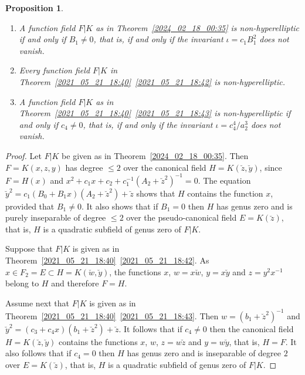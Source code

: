 \documentclass[12pt,reqno]{amsart}
\newtheorem{prop}[thm]{Proposition}
\theoremstyle{definition}
\newcommand{\cy}{{\breve{y}}}
\begin{document}
\begin{prop}\label{2024_08_04_19:50}
$ $
\begin{enumerate}[\upshape (a)]
    \item A function field $F|K$ as in Theorem~\ref{2024_02_18_00:35} is non-hyperelliptic if and only if $B_1 \neq 0$, that is, if and only if the invariant $\iota = c_1 B_1^2$ does not vanish.
    
    \item Every function field $F|K$ in Theorem~\ref{2021_05_21_18:40}~\ref{2021_05_21_18:42} is non-hyperelliptic.
    
    \item A function field $F|K$ as in Theorem~\ref{2021_05_21_18:40}~\ref{2021_05_21_18:43} is non-hyperelliptic if and only if $c_4\neq 0$, that is, if and only if the invariant $\iota = c_4^4/a_2^3$
does not vanish.
\end{enumerate}
\end{prop}

\begin{proof}
Let $F|K$ be given as in Theorem~\ref{2024_02_18_00:35}. 
Then $F=K(x,z,y)$ has degree $\leq 2$ over the canonical field $H=K(\breve z, \breve y)$, since $F=H(x)$ and $x^2 + c_1 x + c_2 + c_1^{-1}(A_2 + \breve z^2)^{-1} = 0$.
The equation $\breve y^2 = c_1 (B_0 + B_1 x)(A_2 + \breve z^2) + \breve z$ shows that $H$ contains the function $x$, provided that $B_1\neq0$.
It also shows that if $B_1=0$ then $H$ has genus zero and is purely inseparable of degree $\leq 2$ over the pseudo-canonical field $E=K(\breve z)$, 
that is, $H$ is a quadratic subfield of genus zero of $F|K$.

Suppose that $F|K$ is given as in Theorem~\ref{2021_05_21_18:40}~\ref{2021_05_21_18:42}. 
As $x\in F_2=E\subset H = K(\breve w,\breve y)$, the functions $x$, $w = x \breve{w}$, $y=x \cy$ and $z = y^2 x^{-1}$ belong to $H$ and therefore $F=H$.

Assume next that $F|K$ is given as in Theorem~\ref{2021_05_21_18:40}~\ref{2021_05_21_18:43}.
Then $w=(b_1 + \breve z^2)^{-1}$ and $\breve y^2 = (c_3 + c_4 x) (b_1 + \breve z^2) + \breve z$.
It follows that if $c_4\neq0$ then the canonical field $H=K(\breve z,\breve y)$ contains the functions $x$, $w$, $z=w \breve z$ and $y = w \breve y$, that is, $H=F$.
It also follows that if $c_4=0$ then $H$ has genus zero and is inseparable of degree $2$ over $E=K(\breve z)$, that is, $H$ is a quadratic subfield of genus zero of $F|K$.
\end{proof}
\end{document}
